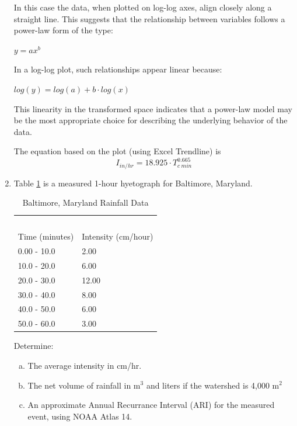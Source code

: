 \documentclass[12pt]{article}
\begin{document}
\begin{enumerate}
In this case the data, when plotted on log-log axes, align closely along a straight line. This suggests that the relationship between variables follows a power-law form of the type:

$ y=ax^b$
 
In a log-log plot, such relationships appear linear because:


$log(y)=log(a)+b \cdot log(x)$

This linearity in the transformed space indicates that a power-law model may be the most appropriate choice for describing the underlying behavior of the data.

The equation based on the plot (using Excel Trendline) is
\begin{equation}
I_{in/hr} = 18.925 \cdot T_{c~min}^{0.665}
\end{equation}

\clearpage
\item Table \ref{tab:Baltimore} is a measured 1-hour hyetograph for Baltimore, Maryland.

\begin{table}[h!]
\centering
\caption{Baltimore, Maryland Rainfall Data}
\begin{tabular}{p{2.0in}p{2.0in}} %
~&~\\
Time (minutes) & Intensity (cm/hour) \\
\hline
\hline
0.00 - 10.0 & 2.00 \\
10.0 - 20.0 & 6.00 \\
20.0 - 30.0 & 12.00 \\
30.0 - 40.0 & 8.00 \\
40.0 - 50.0 & 6.00 \\
50.0 - 60.0 & 3.00 \\
\hline
\end{tabular}
\label{tab:Baltimore}
\end{table}

Determine:
    \begin{enumerate}[a)]
        \item The average intensity in cm/hr.
        \item The net volume of rainfall in m$^3$ and liters if the watershed is 4,000 m$^2$
        \item An approximate Annual Recurrance Interval (ARI) for the measured event, using NOAA Atlas 14. 
    \end{enumerate}


\end{enumerate}
\end{document}
